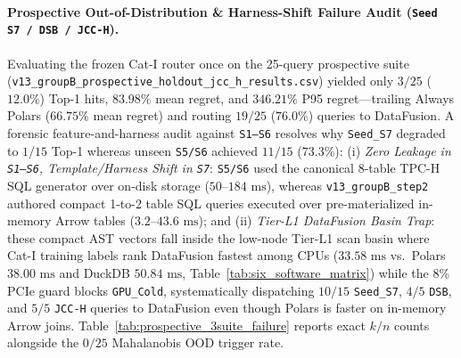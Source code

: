\documentclass[10pt,a4paper]{article}
\begin{document}
\paragraph{Prospective Out-of-Distribution \& Harness-Shift Failure Audit (\texttt{Seed S7 / DSB / JCC-H}).} Evaluating the frozen Cat-I router once on the 25-query prospective suite (\texttt{v13\_\allowbreak{}groupB\_\allowbreak{}prospective\_\allowbreak{}holdout\_\allowbreak{}jcc\_\allowbreak{}h\_\allowbreak{}results.csv}) yielded only $3/25$ ($12.0\%$) Top-1 hits, $83.98\%$ mean regret, and $346.21\%$ P95 regret—trailing Always Polars ($66.75\%$ mean regret) and routing $19/25$ ($76.0\%$) queries to DataFusion. A forensic feature-and-harness audit against \texttt{S1--S6} resolves why \texttt{Seed\_S7} degraded to $1/15$ Top-1 whereas unseen \texttt{S5/S6} achieved $11/15$ ($73.3\%$): (i) \emph{Zero Leakage in \texttt{S1--S6}, Template/Harness Shift in \texttt{S7}}: \texttt{S5/S6} used the canonical 8-table TPC-H SQL generator over on-disk storage ($50\text{--}184\text{ ms}$), whereas \texttt{v13\_groupB\_step2} authored compact 1-to-2 table SQL queries executed over pre-materialized in-memory Arrow tables ($3.2\text{--}43.6\text{ ms}$); and (ii) \emph{Tier-L1 DataFusion Basin Trap}: these compact AST vectors fall inside the low-node Tier-L1 scan basin where Cat-I training labels rank DataFusion fastest among CPUs ($33.58\text{ ms}$ vs.\ Polars $38.00\text{ ms}$ and DuckDB $50.84\text{ ms}$, Table~\ref{tab:six_software_matrix}) while the $8\%$ PCIe guard blocks \texttt{GPU\_Cold}, systematically dispatching $10/15$ \texttt{Seed\_S7}, $4/5$ \texttt{DSB}, and $5/5$ \texttt{JCC-H} queries to DataFusion even though Polars is faster on in-memory Arrow joins. Table~\ref{tab:prospective_3suite_failure} reports exact $k/n$ counts alongside the $0/25$ Mahalanobis OOD trigger rate.
\end{document}
